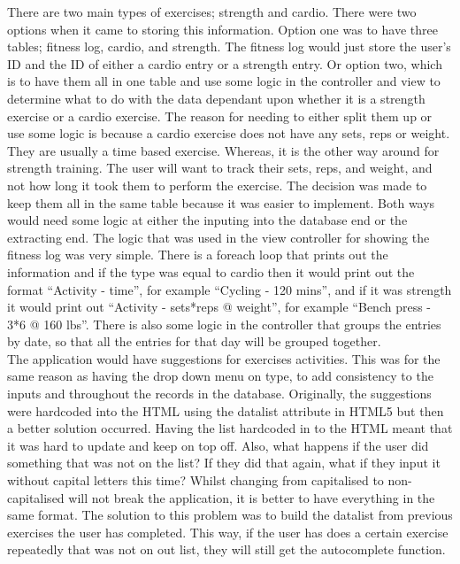 There are two main types of exercises; strength and cardio. There were two options when it came to storing this information. Option one was to have three tables; fitness log, cardio, and strength. The fitness log would just store the user's ID and the ID of either a cardio entry or a strength entry. Or option two, which is to have them all in one table and use some logic in the controller and view to determine what to do with the data dependant upon whether it is a strength exercise or a cardio exercise. The reason for needing to either split them up or use some logic is because a cardio exercise does not have any sets, reps or weight. They are usually a time based exercise. Whereas, it is the other way around for strength training. The user will want to track their sets, reps, and weight, and not how long it took them to perform the exercise. The decision was made to keep them all in the same table because it was easier to implement. Both ways would need some logic at either the inputing into the database end or the extracting end. The logic that was used in the view controller for showing the fitness log was very simple. There is a foreach loop that prints out the information and if the type was equal to cardio then it would print out the format ``Activity - time'', for example ``Cycling - 120 mins'', and if it was strength it would print out ``Activity - sets*reps @ weight'', for example ``Bench press - 3*6 @ 160 lbs''. There is also some logic in the controller that groups the entries by date, so that all the entries for that day will be grouped together.\\

The application would have suggestions for exercises activities. This was for the same reason as having the drop down menu on type, to add consistency to the inputs and throughout the records in the database. Originally, the suggestions were hardcoded into the HTML using the datalist attribute in HTML5 but then a better solution occurred. Having the list hardcoded in to the HTML meant that it was hard to update and keep on top off. Also, what happens if the user did something that was not on the list? If they did that again, what if they input it without capital letters this time? Whilst changing from capitalised to non-capitalised will not break the application, it is better to have everything in the same format. The solution to this problem was to build the datalist from previous exercises the user has completed. This way, if the user has does a certain exercise repeatedly that was not on out list, they will still get the autocomplete function.\\

